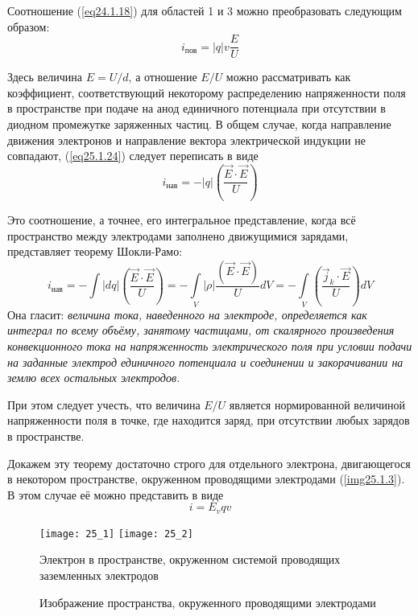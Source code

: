 
Соотношение (\ref{eq24.1.18}) для областей 1 и 3 можно преобразовать следующим 
образом:
\begin{equation}
	i_\text{пов} = |q|v\frac{E}{U}
	\label{eq25.1.24}
\end{equation}

Здесь величина \( E = U/d \), а отношение \( E/U \) можно рассматривать как 
коэффициент, соответствующий некоторому распределению напряженности поля в 
пространстве при подаче на анод единичного потенциала при отсутствии в диодном 
промежутке заряженных частиц. В общем случае, когда направление движения 
электронов и направление вектора электрической индукции не совпадают, 
(\ref{eq25.1.24}) следует переписать в виде
\[
	i_\text{нав} = -|q|\left( \frac{\vec{E}\cdot\vec{E}}{U} \right)
\]

Это соотношение, а точнее, его интегральное представление, когда всё 
пространство между электродами заполнено движущимися зарядами, представляет 
теорему Шокли-Рамо:
\[
	i_\text{нав} = -\int |dq|\left( \frac{\vec{E}\cdot\vec{E}}{U} \right) = 
		-\int\limits_V |\rho| \frac{(\vec{E}\cdot\vec{E})}{U} dV = 
		-\int\limits_V \left( \frac{\vec{j}_k\cdot\vec{E}}{U} \right)dV
\]
Она гласит: \emph{величина тока, наведенного на электроде, определяется как 
интеграл по всему объёму, занятому частицами, от скалярного произведения 
конвекционного тока на напряженность электрического поля при условии подачи 
на заданные электрод единичного потенциала и соединении и закорачивании на 
землю всех остальных электродов.}

При этом следует учесть, что величина \( E/U \) является нормированной 
величиной напряженности поля в точке, где находится заряд, при отсутствии 
любых зарядов в пространстве.

Докажем эту теорему достаточно строго для отдельного электрона, двигающегося 
в некотором пространстве, окруженном проводящими электродами 
(\ref{img25.1.3}). В этом случае её можно представить в виде
\[
	i = E_v qv
\]

\begin{figure}[h!]
	\center
	\texttt{[image: 25\_1]} \hspace{1em}
	\texttt{[image: 25\_2]}
	\parbox{.4\textwidth}{\caption{Электрон в пространстве, окруженном 
		системой проводящих заземленных электродов}
	\label{img25.1.3}} \hspace{1em}
	\parbox{.4\textwidth}{\caption{Изображение пространства, окруженного 
		проводящими электродами}
    \label{img25.1.4}}
\end{figure}

